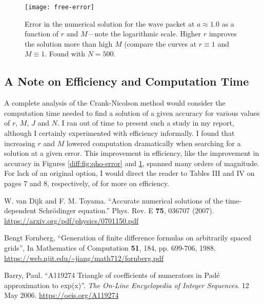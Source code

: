\documentclass[11pt, a4paper]{article}
\newcommand{\schro}{Schr\"{o}dinger\xspace}
\begin{document}
\begin{figure}[htb!]
\centering
\texttt{[image: free-error]}
\caption{Error in the numerical solution for the wave packet at $ a \approx 1.0 $ as a function of $ r $ and $ M $---note the logarithmic scale. Higher $ r $ improves the solution more than high $ M $ (compare the curves at $ r \equiv 1$ and $ M \equiv 1 $. Found with $ N = 500 $.}
\label{diff:fig:free-error}
\end{figure}


\subsection{A Note on Efficiency and Computation Time}
A complete analysis of the Crank-Nicolson method would consider the computation time needed to find a solution of a given accuracy for various values of $ r $, $ M $, $ J $ and $ N $. I ran out of time to present such a study in my report, although I certainly experimented with efficiency informally. I found that increasing $ r $ and $ M $ lowered computation dramatically when searching for a solution at a given error. This improvement in efficiency, like the improvement in accuracy in Figures \ref{diff:fig:qho-error} and \ref{diff:fig:free-error}, spanned many orders of magnitude. For lack of an original option, I would direct the reader to Tables III and IV on pages 7 and 8, respectively, of \cite{vandijk} for more on efficiency.

\begin{thebibliography}{}
\setlength{\itemsep}{.2\itemsep} \setlength{\parsep}{.5\parsep}

 W. van Dijk and F. M. Toyama. ``Accurate numerical solutions of the time-dependent \schro equation.'' Phys. Rev. E \textbf{75}, 036707 (2007). \url{https://arxiv.org/pdf/physics/0701150.pdf}

Bengt Fornberg, ``Generation of finite difference formulas on arbitrarily spaced grids'', In Mathematics of Computation \textbf{51}, 184, pp. 699-706, 1988. \url{https://web.njit.edu/~jiang/math712/fornberg.pdf}

 Barry, Paul. ``A119274 Triangle of coefficients of numerators in Pad\'{e} approximation to exp(x)''. \textit{The On-Line Encyclopedia of Integer Sequences}. 12 May 2006. \url{https://oeis.org/A119274}


\end{thebibliography}
\end{document}
